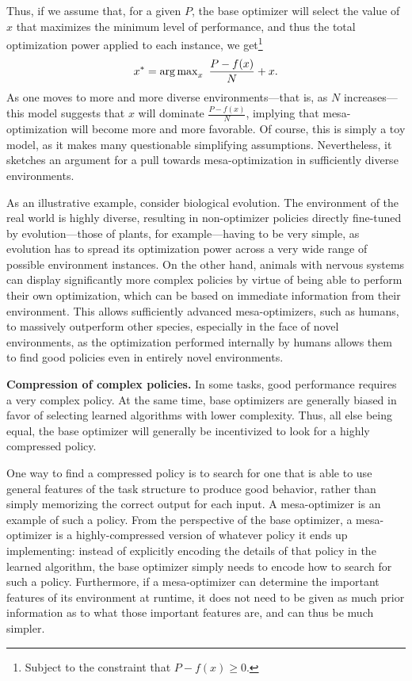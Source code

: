 \documentclass[
  onecolumn,
  natbib,
]{miri-tech-article}
\begin{document}
Thus, if we assume that, for a given $P$, the base optimizer will select the value of $x$ that maximizes the minimum level of performance, and thus the total optimization power applied to each instance, we get\footnote{Subject to the constraint that $P - f(x) \ge 0$.}
\[
  x^* = \operatorname{arg\,max}_x~ \frac{P - f(x)}{N} + x.
\]
As one moves to more and more diverse environments---that is, as $N$ increases---this model suggests that $x$ will dominate $\frac{P - f(x)}{N}$, implying that mesa-optimization will become more and more favorable. Of course, this is simply a toy model, as it makes many questionable simplifying assumptions. Nevertheless, it sketches an argument for a pull towards mesa-optimization in sufficiently diverse environments.

As an illustrative example, consider biological evolution. The environment of the real world is highly diverse, resulting in non-optimizer policies directly fine-tuned by evolution---those of plants, for example---having to be very simple, as evolution has to spread its optimization power across a very wide range of possible environment instances. On the other hand, animals with nervous systems can display significantly more complex policies by virtue of being able to perform their own optimization, which can be based on immediate information from their environment. This allows sufficiently advanced mesa-optimizers, such as humans, to massively outperform other species, especially in the face of novel environments, as the optimization performed internally by humans allows them to find good policies even in entirely novel environments.

\textbf{Compression of complex policies.} In some tasks, good performance requires a very complex policy. At the same time, base optimizers are generally biased in favor of selecting learned algorithms with lower complexity. Thus, all else being equal, the base optimizer will generally be incentivized to look for a highly compressed policy.

One way to find a compressed policy is to search for one that is able to use general features of the task structure to produce good behavior, rather than simply memorizing the correct output for each input. A mesa-optimizer is an example of such a policy. From the perspective of the base optimizer, a mesa-optimizer is a highly-compressed version of whatever policy it ends up implementing: instead of explicitly encoding the details of that policy in the learned algorithm, the base optimizer simply needs to encode how to search for such a policy. Furthermore, if a mesa-optimizer can determine the important features of its environment at runtime, it does not need to be given as much prior information as to what those important features are, and can thus be much simpler.
\end{document}
